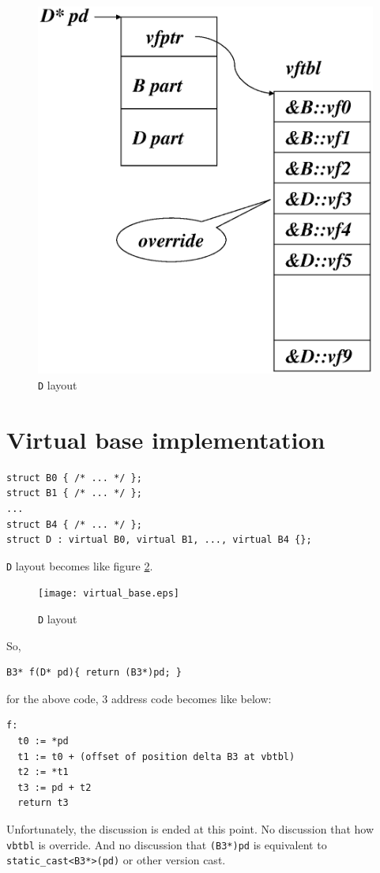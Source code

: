 \documentclass{article}
\begin{document}
\vspace{0.5cm}
\begin{figure}[htbp]
\begin{center}
\includegraphics[width=0.91\linewidth,height=1.0\linewidth]{virtual_function2.eps}
\caption{{\tt{D}} layout}
\label{derived_e002}
\end{center}
\end{figure}

\section{Virtual base implementation}

\begin{verbatim}
struct B0 { /* ... */ };
struct B1 { /* ... */ };
...
struct B4 { /* ... */ };
struct D : virtual B0, virtual B1, ..., virtual B4 {};
\end{verbatim}
{\tt {D}} layout becomes like figure \ref{derived_e001}.

\vspace{0.5cm}
\begin{figure}[htbp]
\begin{center}
\texttt{[image: virtual\_base.eps]}
\caption{{\tt{D}} layout}
\label{derived_e001}
\end{center}
\end{figure}

So,
\begin{verbatim}
B3* f(D* pd){ return (B3*)pd; }
\end{verbatim}
for the above code, 3 address code becomes like below:
\begin{verbatim}
f:
  t0 := *pd
  t1 := t0 + (offset of position delta B3 at vbtbl)
  t2 := *t1
  t3 := pd + t2
  return t3
\end{verbatim}

Unfortunately, the discussion is ended at this point. No discussion that
how {\tt{vbtbl}} is override. And no discussion that {\tt{(B3*)pd}}
is equivalent to {\tt{static\_cast<B3*>(pd)}} or other version cast.  
\end{document}
